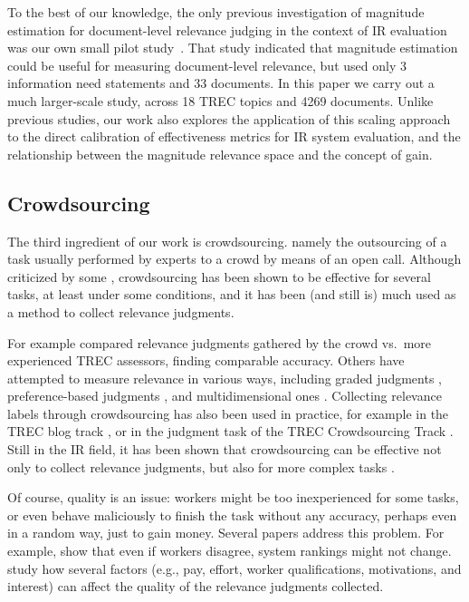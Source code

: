 To the best of our knowledge, the only previous investigation of
magnitude estimation for document-level relevance judging in the
context of IR evaluation was our own small pilot study~\cite{SchMad14,MadMiz15}.
That study indicated that 
magnitude estimation could be useful for
measuring document-level relevance, but used only 
3 information need statements and 33 documents.
In this paper we carry out a much larger-scale study, across 18 TREC
topics and 4269 documents.
Unlike previous studies, 
our work also explores the application of this scaling approach to the
direct calibration of effectiveness metrics for IR system evaluation,
and the relationship between the magnitude relevance space and the
concept of gain.

\subsection{Crowdsourcing}
\label{sec:crowdsourcing}

The third ingredient of our work is crowdsourcing. 
namely the outsourcing of a task usually performed by experts to a
crowd by means of an open call. 
Although criticized by some \cite{keen2008}, crowdsourcing has been
shown to be effective for several tasks, at least under some
conditions, and
it has been (and still is) much used as a method to collect relevance
judgments. 

For example \citet{Alonso:2012} compared relevance judgments gathered
by the crowd vs.\ more experienced TREC assessors, finding comparable
accuracy. 
Others have attempted to measure relevance in various ways, including
graded judgments \cite{mccreadie:2011}, preference-based judgments
\cite{Anderton2012}, and multidimensional ones \cite{Zhang2014}.
Collecting relevance labels through crowdsourcing has also been used
in practice, for example in the TREC blog track \cite{mccreadie:2011},
or in the judgment task of the TREC Crowdsourcing Track
\cite{Smucker2014}. 
Still in the IR field, it has been shown that crowdsourcing can be
effective not only to collect relevance judgments, but also for more
complex tasks \cite{Zuccon:2013}.


Of course, quality is an issue: workers might be too inexperienced for
some tasks, or even behave maliciously to finish the task without any
accuracy, perhaps even in a random way, just to gain money. 
Several papers address this problem.
For example, \citet{Clough2013} show that even if workers disagree,
system rankings might not change. 
\citet{Kazai2013} study how several factors (e.g., pay, effort, worker
qualifications, motivations, and interest) can affect the quality of
the relevance judgments collected.

